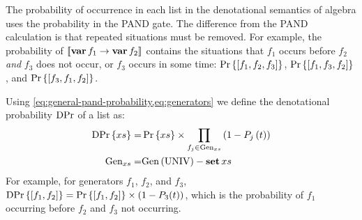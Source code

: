 \documentclass[12pt,openright,twoside,a4paper,oldfontcommands,english,brazil,final]{abntex2}
\theoremstyle{theo}
\def\varop{\ensuremath\operatorname{\mathbf{var}}}
\newcommand{\var}[1]{\ensuremath\varop #1}
\def\xbeforeop{\ensuremath\rightarrow}
\newcommand{\xbefore}[2]{\ensuremath #1 \xbeforeop #2 }
\def\True{\ensuremath\operatorname{UNIV}}
\def\listsetop{\ensuremath\operatorname{\mathbf{set}}}
\newcommand{\listset}[1]{\ensuremath\listsetop #1}
\def\probabilityop{\ensuremath \Pr}
\newcommand{\probability}[1]{\ensuremath \probabilityop\left\{#1\right\}}
\def\denotationalprobop{\ensuremath\mathrm{DPr}}
\newcommand{\denotationalprob}[1]{\ensuremath \denotationalprobop\left\{#1\right\}}
\def\filterop{\ensuremath\mathrm{filter}}
\newcommand{\filter}[2]{\ensuremath\filterop_{#1}\left(#2\right)}
\newcommand{\denote}[1]{\ensuremath\left[\!\left[#1\right]\!\right]}
\def\generators{\ensuremath\mathrm{Gen}}
\def\permutationsop{\ensuremath\mathrm{permutations}}
\newcommand{\permutations}[1]{\ensuremath\permutationsop\left(#1\right)}
\newcommand{\listsof}[2]{\ensuremath\mathrm{lists}\left(#1, #2\right)}
\begin{document}
The probability of occurrence in each list in the denotational semantics of \ac{algebra} uses the probability in the \ac{PAND} gate.
The difference from the \ac{PAND} calculation is that repeated situations must be removed.
For example, the probability of $\denote{\xbefore{\var{f_1}}{\var{f_2}}}$ contains the situations that $f_1$ occurs before $f_2$ \emph{and} $f_3$ does not occur, or $f_3$ occurs in some time: $\probability{\left[f_1,f_2,f_3\right]}$, $\probability{\left[f_1,f_3,f_2\right]}$, and $\probability{\left[f_3,f_1,f_2\right]}$.
%
%
%

Using \cref{eq:general-pand-probability,eq:generators} we define the denotational probability $\denotationalprobop$ of a list as:
%
\begin{subequations}
\begin{align}
\denotationalprob{xs} = &
  \probability{xs} \times \prod_{f_j \in \generators_{xs}} \left(1-P_j\left(t\right)\right)\label{eq:denotational-probability}\\
\generators_{xs} = & \generators\left(\True\right) - \listset{xs}\label{eq:generators-minus-list}
\end{align}
\end{subequations}
%
%
For example, for generators $f_1$, $f_2$, and $f_3$, $\denotationalprob{\left[f_1,f_2\right]} = \probability{\left[f_1,f_2\right]}\times\left(1-P_3(t)\right)$, which is the probability of $f_1$ occurring before $f_2$ and $f_3$ not occurring.
\end{document}
